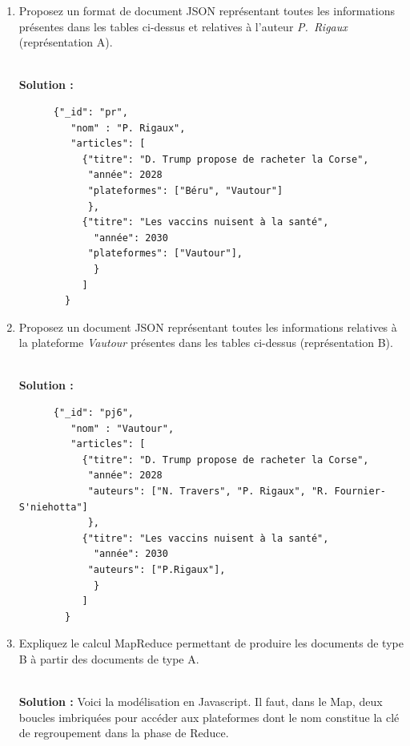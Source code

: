 \documentclass[11pt,a4paper]{article}
\newenvironment{solution}[0]{
~\\ \color{red} \textbf{Solution : }\color{black}}{%
}
\begin{document}
\begin{enumerate}
  \item Proposez un format de document JSON représentant toutes les informations présentes dans les  
        tables ci-dessus et
        relatives à l'auteur \emph{P.~Rigaux} (représentation A).


\begin{solution}
    \begin{small}
    \begin{verbatim}
      {"_id": "pr",
         "nom" : "P. Rigaux",
         "articles": [
           {"titre": "D. Trump propose de racheter la Corse", 
            "année": 2028
            "plateformes": ["Béru", "Vautour"]
            },
           {"titre": "Les vaccins nuisent à la santé", 
             "année": 2030
            "plateformes": ["Vautour"],
             }
           ]
        }
    \end{verbatim}
    \end{small}
\end{solution}

  \item Proposez un document JSON représentant toutes les 
        informations relatives à la plateforme \emph{Vautour} 
        présentes dans les tables ci-dessus
         (représentation B).
        

\begin{solution}
    \begin{small}
    \begin{verbatim}
      {"_id": "pj6",
         "nom" : "Vautour",
         "articles": [
           {"titre": "D. Trump propose de racheter la Corse", 
            "année": 2028
            "auteurs": ["N. Travers", "P. Rigaux", "R. Fournier-S'niehotta"]
            },
           {"titre": "Les vaccins nuisent à la santé", 
             "année": 2030
            "auteurs": ["P.Rigaux"],
             }
           ]
        }
    \end{verbatim}
    \end{small}
\end{solution}


   \item Expliquez le calcul MapReduce permettant de produire les documents
   de type B à partir des documents de type A.


\begin{solution}
   Voici la modélisation en Javascript. Il faut, dans le Map, deux boucles imbriquées pour 
      accéder aux plateformes dont le nom constitue la clé de regroupement dans la phase de Reduce. 


\end{solution}
\end{enumerate}
\end{document}
